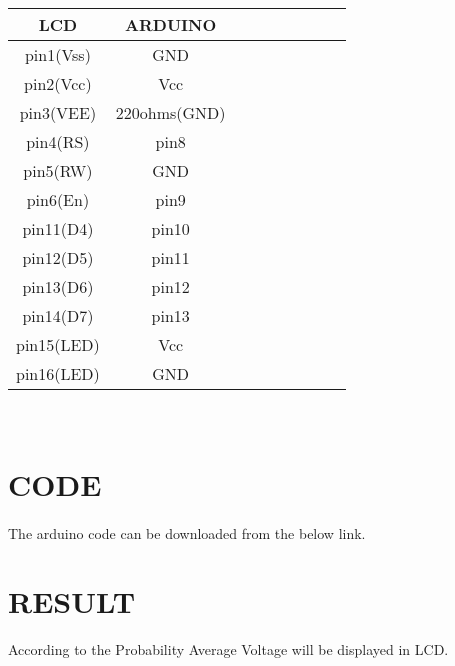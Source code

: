 \documentclass[a4paper,11pt,twocolumn]{article}
\begin{document}
\begin{table}[ht!]
    \centering
    \begin{tabular}{|c|c|c|c|c|c|c|c|c|}
    \hline
            LCD&ARDUINO  \\
         \hline
	    pin1(Vss)&GND \\
	    pin2(Vcc)&Vcc \\
	    pin3(VEE)&220ohms(GND) \\
	    pin4(RS)& pin8 \\
            pin5(RW) &GND \\
            pin6(En)&pin9 \\
	    pin11(D4) & pin10 \\
	    pin12(D5)& pin11 \\
	    pin13(D6)& pin12\\
	    pin14(D7)& pin13\\
	    pin15(LED)&Vcc\\
	    pin16(LED)&GND\\
         \hline
    \end{tabular}
\caption{}
\end{table}
\\
\bigskip
\section{CODE}
\paragraph{}
	The arduino code can be downloaded from the below link.
\begin{center} 
\end{center}
\bigskip
\section{RESULT}
According to the Probability Average Voltage will be displayed in LCD.
\end{document}
